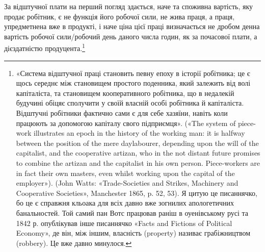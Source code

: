 За відштучної плати на перший погляд здається, наче та
споживна вартість, яку продає робітник, є не функція його
робочої сили, не жива праця, а праця, упредметнена вже в
продукті, і наче ціна цієї праці визначається не дробом
денна вартість робочої сили/робочий день даного числа годин,
як за почасової плати, а дієздатністю продуцента.\footnote{
«Система відштучної праці становить певну епоху в історії робітника;
це є щось середнє між становищем простого поденника, який залежить
від волі капіталіста, та становищем кооперативного робітника, що
в недалекій будучині обіцяє сполучити у своїй власній особі робітника
й капіталіста. Відштучні робітники фактично сами є для себе хазяїни,
навіть коли працюють за допомогою капіталу свого підприємця». («The
system of piece-work illustrates an epoch in the history of the working
man: it is halfway between the position of the mere daylabourer, depending
upon the will of the capitalist, and the cooperative artizan, who in
the not distant future promises to combine the artizan and the capitalist
in his own person. Piece-workers are in fact their own masters, even whilst
working upon the capital of the employer»). (John Watts: «Trade-Societies
and Strikes, Machinery and Cooperative Societies», Manchester 1865,
p. 52, 53). Я цитую це писаннячко, бо це є справжня кльоака для всіх
давно вже зогнилих апологетичних банальностей. Той самий пан Вотс
працював раніш в оуенівському русі та 1842 р. опублікував інше писаннячко
«Facts and Fictions of Political Economy», де він, між іншим, власність
(property) називає грабіжництвом (robbery). Це вже давно минулося.
}

